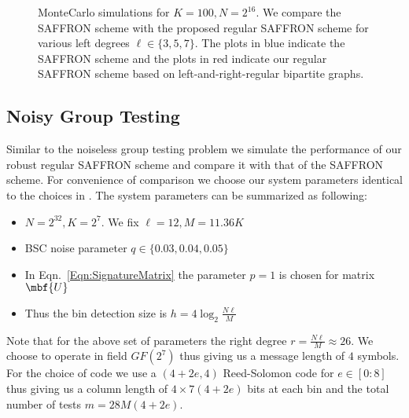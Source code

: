 \documentclass[conference,twocolumn]{IEEEtran}
\newcommand*{\MyPath}{../../bib}
\newcommand*{\FigPath}{../Figures}
\begin{document}
\begin{figure}[t!]
\centering

\caption{MonteCarlo simulations for $K=100, N=2^{16}$. We compare the SAFFRON scheme \cite{lee2015saffron} with the proposed regular SAFFRON scheme for various left degrees $\ell\in\{3,5,7\}$. 
The plots in blue indicate the SAFFRON scheme and the plots in red indicate our regular SAFFRON scheme based on left-and-right-regular bipartite graphs.}
\label{Fig:SimulationNoisy}
\end{figure}


\subsection*{Noisy Group Testing}
Similar to the noiseless group testing problem we simulate the performance of our robust regular SAFFRON scheme and compare it with that of the SAFFRON scheme. For convenience of comparison we choose our system parameters identical to the choices in \cite{lee2015saffron}. The system parameters can be summarized as following:
\begin{itemize}
\item $N=2^{32}, K=2^7$. We fix $\ell=12, M=11.36K$ 
\item BSC noise parameter $q\in\{0.03,0.04,0.05\}$
\item In Eqn.~\ref{Eqn:SignatureMatrix} the parameter $p=1$ is chosen for matrix $\mbf{U}$
\item Thus the bin detection size is $h=4\log_2 \frac{N\ell}{M}$
\end{itemize}
Note that for the above set of parameters the right degree $r=\frac{N\ell}{M}\approx 26$. We choose to operate in field $GF(2^7)$ thus giving us a message length of $4$ symbols. For the choice of code we use a $(4+2e,4)$ Reed-Solomon code for $e\in[0:8]$ thus giving us a column length of $4\times 7(4+2e)$ bits at each bin and the total number of tests $m=28M(4+2e)$.




\end{document}
